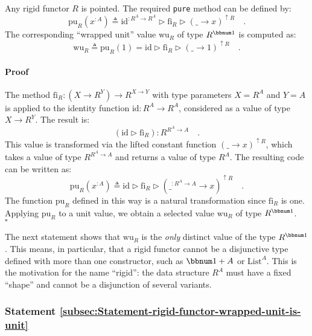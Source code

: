 Any rigid functor $R$ is pointed. The required \lstinline!pure!
method can be defined by:
\[
\text{pu}_{R}(x^{:A})\triangleq\text{id}^{:R^{A}\rightarrow R^{A}}\triangleright\text{fi}_{R}\triangleright(\_\rightarrow x)^{\uparrow R}\quad.
\]
The corresponding \textsf{``}wrapped unit\textsf{''} value $\text{wu}_{R}$ of type
$R^{\bbnum 1}$ is computed as: 
\begin{equation}
\text{wu}_{R}\triangleq\text{pu}_{R}(1)=\text{id}\triangleright\text{fi}_{R}\triangleright(\_\rightarrow1)^{\uparrow R}\quad.\label{eq:rigid-functor-def-of-wrapped-unit}
\end{equation}


\paragraph{Proof}

The method $\text{fi}_{R}:(X\rightarrow R^{Y})\rightarrow R^{X\rightarrow Y}$
with type parameters $X=R^{A}$ and $Y=A$ is applied to the identity
function $\text{id}:R^{A}\rightarrow R^{A}$, considered as a value
of type $X\rightarrow R^{Y}$. The result is:
\[
(\text{id}\triangleright\text{fi}_{R}):R^{R^{A}\rightarrow A}\quad.
\]
This value is transformed via the lifted constant function $\left(\_\rightarrow x\right)^{\uparrow R}$,
which takes a value of type $R^{R^{A}\rightarrow A}$ and returns
a value of type $R^{A}$. The resulting code can be written as:
\[
\text{pu}_{R}(x^{:A})\triangleq\text{id}\triangleright\text{fi}_{R}\triangleright(\_^{:R^{A}\rightarrow A}\rightarrow x)^{\uparrow R}\quad.
\]
The function $\text{pu}_{R}$ defined in this way is a natural transformation
since $\text{fi}_{R}$ is one. Applying $\text{pu}_{R}$ to a unit
value, we obtain a selected value $\text{wu}_{R}$ of type $R^{\bbnum 1}$.
$\quad$$\square$

The next statement shows that $\text{wu}_{R}$ is the \emph{only}
distinct value of the type $R^{\bbnum 1}$. This means, in particular,
that a rigid functor cannot be a disjunctive type defined with more
than one constructor, such as $\bbnum 1+A$ or $\text{List}^{A}$.
This is the motivation for the name \textsf{``}rigid\textsf{''}: the data structure
$R^{A}$ must have a fixed \textsf{``}shape\textsf{''} and cannot be a disjunction
of several variants. 

\subsubsection{Statement \label{subsec:Statement-rigid-functor-wrapped-unit-is-unit}\ref{subsec:Statement-rigid-functor-wrapped-unit-is-unit}}

